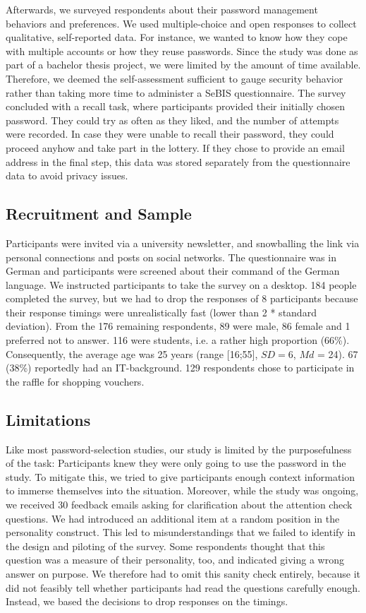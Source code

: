 Afterwards, we surveyed respondents about their password management behaviors and preferences. We used multiple-choice and open responses to collect qualitative, self-reported data. For instance, we wanted to know how they cope with multiple accounts or how they reuse passwords. Since the study was done as part of a bachelor thesis project, we were limited by the amount of time available. Therefore, we deemed the self-assessment sufficient to gauge security behavior rather than taking more time to administer a SeBIS questionnaire. The survey concluded with a recall task, where participants provided their initially chosen password. They could try as often as they liked, and the number of attempts were recorded. In case they were unable to recall their password, they could proceed anyhow and take part in the lottery. If they chose to provide an email address in the final step, this data was stored separately from the questionnaire data to avoid privacy issues. 

\subsection{Recruitment and Sample}
Participants were invited via a university newsletter, and snowballing the link via personal connections and posts on social networks. The questionnaire was in German and participants were screened about their command of the German language. We instructed participants to take the survey on a desktop. 
184 people completed the survey, but we had to drop the responses of 8 participants because their response timings were unrealistically fast (lower than 2 * standard deviation). From the 176 remaining respondents, 89 were male, 86 female and 1 preferred not to answer. 116 were students, i.e. a rather high proportion (66\%). Consequently, the average age was 25 years (range [16;55], $SD = 6$, $Md$ = 24). 67 (38\%) reportedly had an IT-background. 129 respondents chose to participate in the raffle for shopping vouchers. 

\subsection{Limitations}
Like most password-selection studies, our study is limited by the purposefulness of the task: Participants knew they were only going to use the password in the study. To mitigate this, we tried to give participants enough context information to immerse themselves into the situation. Moreover, while the study was ongoing, we received 30 feedback emails asking for clarification about the attention check questions. We had introduced an additional item at a random position in the personality construct. This led to misunderstandings that we failed to identify in the design and piloting of the survey. Some respondents thought that this question was a measure of their personality, too, and indicated giving a wrong answer on purpose. We therefore had to omit this sanity check entirely, because it did not feasibly tell whether participants had read the questions carefully enough. Instead, we based the decisions to drop responses on the timings. 

